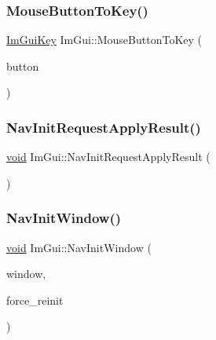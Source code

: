 \mbox{\label{namespaceImGui_a25689086f813c9714c4bbd4e3d5e669c}} 
\subsubsection{\texorpdfstring{Mouse\+Button\+To\+Key()}{MouseButtonToKey()}}
{\footnotesize\ttfamily \hyperlink{imgui_8h_aa22ffe36b188427d712447ec465203d4}{Im\+Gui\+Key} Im\+Gui\+::\+Mouse\+Button\+To\+Key (\begin{DoxyParamCaption}\item[{Im\+Gui\+Mouse\+Button}]{button }\end{DoxyParamCaption})\hspace{0.3cm}{\ttfamily [inline]}}

\mbox{\label{namespaceImGui_a51e560cdb17a961810d557df80a4eaaa}} 
\subsubsection{\texorpdfstring{Nav\+Init\+Request\+Apply\+Result()}{NavInitRequestApplyResult()}}
{\footnotesize\ttfamily \hyperlink{imgui__impl__opengl3__loader_8h_ac668e7cffd9e2e9cfee428b9b2f34fa7}{void} Im\+Gui\+::\+Nav\+Init\+Request\+Apply\+Result (\begin{DoxyParamCaption}{ }\end{DoxyParamCaption})}

\mbox{\label{namespaceImGui_ae46a79d836c4b223c7030ea432e3ec15}} 
\subsubsection{\texorpdfstring{Nav\+Init\+Window()}{NavInitWindow()}}
{\footnotesize\ttfamily \hyperlink{imgui__impl__opengl3__loader_8h_ac668e7cffd9e2e9cfee428b9b2f34fa7}{void} Im\+Gui\+::\+Nav\+Init\+Window (\begin{DoxyParamCaption}\item[{\hyperlink{structImGuiWindow}{Im\+Gui\+Window} $\ast$}]{window,  }\item[{bool}]{force\+\_\+reinit }\end{DoxyParamCaption})}

